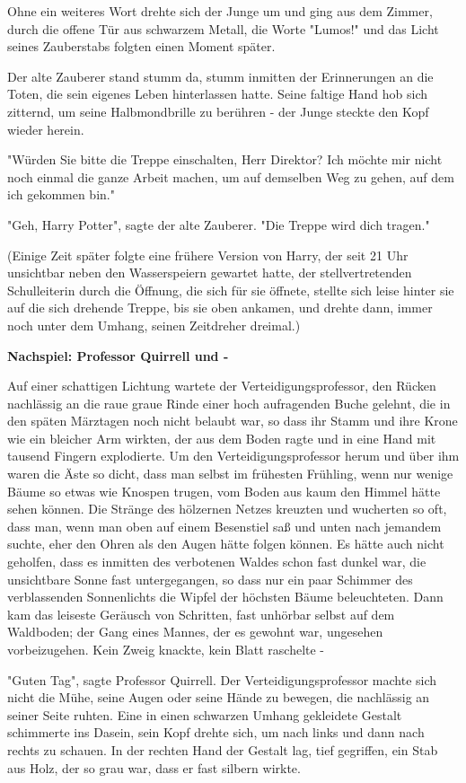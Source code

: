 {Ohne ein weiteres Wort drehte sich der Junge um und ging aus dem Zimmer, durch die offene Tür aus schwarzem Metall, die Worte "Lumos!" und das Licht seines Zauberstabs folgten einen Moment später.

Der alte Zauberer stand stumm da, stumm inmitten der Erinnerungen an die Toten, die sein eigenes Leben hinterlassen hatte. Seine faltige Hand hob sich zitternd, um seine Halbmondbrille zu berühren - der Junge steckte den Kopf wieder herein.

"Würden Sie bitte die Treppe einschalten, Herr Direktor? Ich möchte mir nicht noch einmal die ganze Arbeit machen, um auf demselben Weg zu gehen, auf dem ich gekommen bin."

"Geh, Harry Potter", sagte der alte Zauberer. "Die Treppe wird dich tragen."

(Einige Zeit später folgte eine frühere Version von Harry, der seit 21 Uhr unsichtbar neben den Wasserspeiern gewartet hatte, der stellvertretenden Schulleiterin durch die Öffnung, die sich für sie öffnete, stellte sich leise hinter sie auf die sich drehende Treppe, bis sie oben ankamen, und drehte dann, immer noch unter dem Umhang, seinen Zeitdreher dreimal.)

\textbf{Nachspiel: Professor Quirrell und -}

Auf einer schattigen Lichtung wartete der Verteidigungsprofessor, den Rücken nachlässig an die raue graue Rinde einer hoch aufragenden Buche gelehnt, die in den späten Märztagen noch nicht belaubt war, so dass ihr Stamm und ihre Krone wie ein bleicher Arm wirkten, der aus dem Boden ragte und in eine Hand mit tausend Fingern explodierte. Um den Verteidigungsprofessor herum und über ihm waren die Äste so dicht, dass man selbst im frühesten Frühling, wenn nur wenige Bäume so etwas wie Knospen trugen, vom Boden aus kaum den Himmel hätte sehen können. Die Stränge des hölzernen Netzes kreuzten und wucherten so oft, dass man, wenn man oben auf einem Besenstiel saß und unten nach jemandem suchte, eher den Ohren als den Augen hätte folgen können. Es hätte auch nicht geholfen, dass es inmitten des verbotenen Waldes schon fast dunkel war, die unsichtbare Sonne fast untergegangen, so dass nur ein paar Schimmer des verblassenden Sonnenlichts die Wipfel der höchsten Bäume beleuchteten. Dann kam das leiseste Geräusch von Schritten, fast unhörbar selbst auf dem Waldboden; der Gang eines Mannes, der es gewohnt war, ungesehen vorbeizugehen. Kein Zweig knackte, kein Blatt raschelte -

"Guten Tag", sagte Professor Quirrell. Der Verteidigungsprofessor machte sich nicht die Mühe, seine Augen oder seine Hände zu bewegen, die nachlässig an seiner Seite ruhten. Eine in einen schwarzen Umhang gekleidete Gestalt schimmerte ins Dasein, sein Kopf drehte sich, um nach links und dann nach rechts zu schauen. In der rechten Hand der Gestalt lag, tief gegriffen, ein Stab aus Holz, der so grau war, dass er fast silbern wirkte.

}
